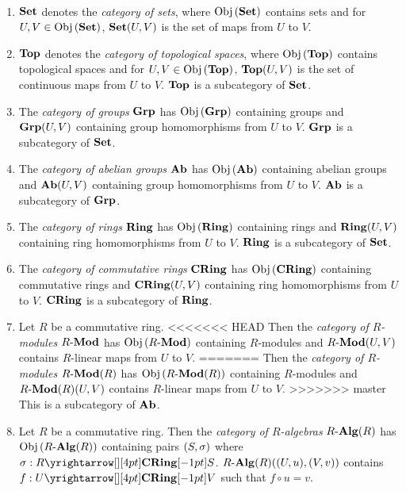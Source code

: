 \begin{eg}~
  \begin{enumerate}
    \item $\mathbf{Set}$ denotes the \emph{category of sets}, where 
    $\mathrm{Obj}\left(\mathbf{Set}\right)$ contains sets and for $U, V \in \mathrm{Obj}\left(\mathbf{Set}\right)$, 
    $\mathbf{Set}(U,V)$ is the set of maps from $U$ to $V$. 
    \item $\mathbf{Top}$ denotes the \emph{category of topological spaces}, where
    $\mathrm{Obj}\left(\mathbf{Top}\right)$ contains topological spaces and for $U, V \in \mathrm{Obj}\left(\mathbf{Top}\right)$, 
    $\mathbf{Top}(U,V)$ is the set of continuous maps from $U$ to $V$. 
    $\mathbf{Top}$ is a subcategory of $\mathbf{Set}$. 
    \item The \emph{category of groups} $\mathbf{Grp}$ has 
    $\mathrm{Obj}\left(\mathbf{Grp}\right)$ containing groups and 
    $\mathbf{Grp}(U,V)$ containing group homomorphisms from $U$ to $V$. 
    $\mathbf{Grp}$ is a subcategory of $\mathbf{Set}$.  
    \item The \emph{category of abelian groups} $\mathbf{Ab}$ has 
    $\mathrm{Obj}\left(\mathbf{Ab}\right)$ containing abelian groups and 
    $\mathbf{Ab}(U,V)$ containing group homomorphisms from $U$ to $V$. 
    $\mathbf{Ab}$ is a subcategory of $\mathbf{Grp}$. 
    \item The \emph{category of rings} $\mathbf{Ring}$ has 
    $\mathrm{Obj}\left(\mathbf{Ring}\right)$ containing rings and 
    $\mathbf{Ring}(U,V)$ containing ring homomorphisms from $U$ to $V$.
    $\mathbf{Ring}$ is a subcategory of $\mathbf{Set}$. 
    \item The \emph{category of commutative rings} $\mathbf{CRing}$ has 
    $\mathrm{Obj}\left(\mathbf{CRing}\right)$ containing commutative rings and 
    $\mathbf{CRing}(U,V)$ containing ring homomorphisms from $U$ to $V$.
    $\mathbf{CRing}$ is a subcategory of $\mathbf{Ring}$. 
    \item Let $R$ be a commutative ring. 
<<<<<<< HEAD
    Then the \emph{category of $R$-modules} $R\text{-}\mathbf{Mod}$ has 
    $\mathrm{Obj}\left(R\text{-}\mathbf{Mod}\right)$ containing $R$-modules and 
    $R\text{-}\mathbf{Mod}(U,V)$ contains $R$-linear maps from $U$ to $V$.
=======
    Then the \emph{category of $R$-modules} $R\text{-}\mathbf{Mod}(R)$ has 
    $\mathrm{Obj}\left(R\text{-}\mathbf{Mod}(R)\right)$ containing $R$-modules and 
    $R\text{-}\mathbf{Mod}(R)(U,V)$ contains $R$-linear maps from $U$ to $V$.
>>>>>>> master
    This is a subcategory of $\mathbf{Ab}$. 
    \item Let $R$ be a commutative ring. 
    Then the \emph{category of $R$-algebras} $R\text{-}\mathbf{Alg}(R)$ has 
    $\mathrm{Obj}\left(R\text{-}\mathbf{Alg}(R)\right)$ containing pairs $(S,\sigma)$ where $\si : \map{R}{S}{\CRING}{}$.
    $R\text{-}\mathbf{Alg}(R)((U,u),(V,v))$ contains $f : \map{U}{V}{\CRING}{}$ such that 
    $f \circ u = v$. 
  \end{enumerate}
\end{eg}

